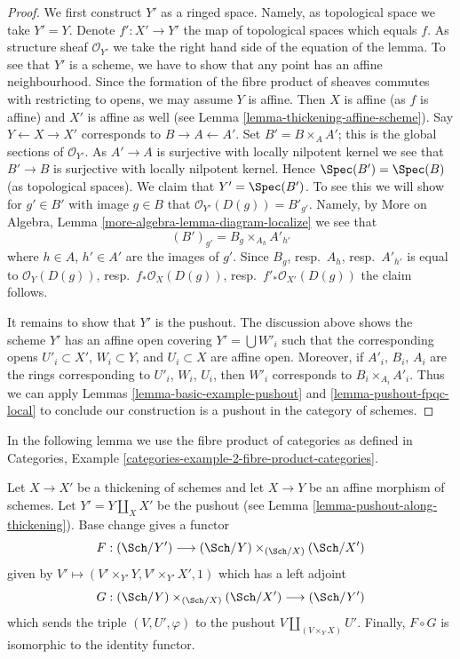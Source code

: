 \begin{proof}
We first construct $Y'$ as a ringed space. Namely, as topological
space we take $Y' = Y$. Denote $f' : X' \to Y'$ the map of topological
spaces which equals $f$. As structure sheaf $\mathcal{O}_{Y'}$ we take
the right hand side of the equation of the lemma. To see that
$Y'$ is a scheme, we have to show that any point has an affine
neighbourhood. Since the formation of the fibre product of sheaves
commutes with restricting to opens, we may assume $Y$ is affine.
Then $X$ is affine (as $f$ is affine) and $X'$ is affine as well
(see Lemma \ref{lemma-thickening-affine-scheme}).
Say $Y \leftarrow X \rightarrow X'$ corresponds
to $B \rightarrow A \leftarrow A'$. Set $B' = B \times_A A'$; this
is the global sections of $\mathcal{O}_{Y'}$. As $A' \to A$ is surjective
with locally nilpotent kernel we see that $B' \to B$ is surjective
with locally nilpotent kernel. Hence $\Spec(B') = \Spec(B)$ (as
topological spaces). We claim that $Y' = \Spec(B')$. To see this
we will show for $g' \in B'$ with image $g \in B$ that
$\mathcal{O}_{Y'}(D(g)) = B'_{g'}$. Namely, by
More on Algebra, Lemma \ref{more-algebra-lemma-diagram-localize} we see that
$$
(B')_{g'} = B_g \times_{A_h} A'_{h'}
$$
where $h \in A$, $h' \in A'$ are the images of $g'$. Since
$B_g$, resp.\ $A_h$, resp.\ $A'_{h'}$ is equal to $\mathcal{O}_Y(D(g))$,
resp.\ $f_*\mathcal{O}_X(D(g))$, resp.\ $f'_*\mathcal{O}_{X'}(D(g))$ the
claim follows.

\medskip\noindent
It remains to show that $Y'$ is the pushout.
The discussion above shows the scheme $Y'$
has an affine open covering $Y' = \bigcup W'_i$
such that the corresponding opens
$U'_i \subset X'$, $W_i \subset Y$, and
$U_i \subset X$ are affine open.
Moreover, if $A'_i$, $B_i$, $A_i$ are the rings corresponding to
$U'_i$, $W_i$, $U_i$, then
$W'_i$ corresponds to $B_i \times_{A_i} A'_i$.
Thus we can apply Lemmas \ref{lemma-basic-example-pushout} and
\ref{lemma-pushout-fpqc-local} to conclude our construction is a pushout
in the category of schemes.
\end{proof}

\noindent
In the following lemma we use the fibre product of categories as
defined in
Categories, Example \ref{categories-example-2-fibre-product-categories}.

\begin{lemma}
\label{lemma-equivalence-categories-schemes-over-pushout}
Let $X \to X'$ be a thickening of schemes and let $X \to Y$ be an
affine morphism of schemes. Let $Y' = Y \amalg_X X'$ be the pushout
(see Lemma \ref{lemma-pushout-along-thickening}). Base change gives
a functor
$$
F : (\Sch/Y') \longrightarrow (\Sch/Y) \times_{(\Sch/X)} (\Sch/X')
$$
given by $V' \longmapsto (V' \times_{Y'} Y, V' \times_{Y'} X', 1)$
which has a left adjoint
$$
G : (\Sch/Y) \times_{(\Sch/X)} (\Sch/X') \longrightarrow (\Sch/Y')
$$
which sends the triple $(V, U', \varphi)$ to the pushout
$V \amalg_{(V \times_Y X)} U'$. Finally, $F \circ G$ is isomorphic to the
identity functor.
\end{lemma}

